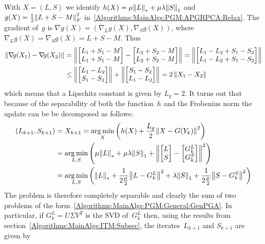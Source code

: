 \documentclass{../../common/projectreport}
\begin{document}
With $X=(L,S)$ we identify $h(X) = \mu {\left\|L\right\|}_{*}^{} + \mu \lambda {\left\|S\right\|}_{1}^{}$ and $g(X) = \frac{1}{2} {\left\|L+S-M\right\|}_{F}^{2}$ in~\eqref{Algorithms:MainAlgs:PGM:APGRPCA:Relax}. The gradient of~$g$ is $\nabla g(X) = (\nabla_{\!L} g(X),\nabla_{\!S} g(X))$, where $\nabla_{\!L} g(X) = \nabla_{\!S} g(X) = L+S-M$. Thus
\begin{align*}
{\left\|\operatorname{\nabla\!\!}g(X_1) -\operatorname{\nabla\!\!}g(X_2)\right\|}_{}^{} &= {\left\|\begin{bmatrix} L_1+S_1-M \\ L_1+S_1-M  \end{bmatrix} - \begin{bmatrix} L_2+S_2-M \\ L_2+S_2-M  \end{bmatrix}\right\|}_{}^{} = {\left\|\begin{bmatrix} L_1-L_2 + S_1-S_2 \\ L_1-L_2 + S_1-S_2  \end{bmatrix}\right\|}_{}^{} \\
&\leq {\left\|\begin{bmatrix} L_1-L_2\\ S_1-S_2  \end{bmatrix}\right\|}_{}^{} + {\left\|\begin{bmatrix} S_1-S_2\\ L_1-L_2  \end{bmatrix}\right\|}_{}^{} = 2\, {\left\|X_1-X_2\right\|}_{}^{}
\end{align*}
which means that a Lipschitz constant is given by $L_g =2$. It turns out that because of the separability of both the function~$h$ and the Frobenius norm the update can be be decomposed as follows:
%
\begin{align*}
(L_{k+1},S_{k+1}) &= X_{k+1} = \operatorname*{arg\,min}_X \left( h(X) +\frac{L_g}{2} {\left\|X-G(Y_k)\right\|}_{}^{2} \right)  \\
&= \operatorname*{arg\,min}_{L,S} \left( \mu {\left\|L\right\|}_{*}^{} + \mu \lambda {\left\|S\right\|}_{1}^{} + {\left\|\begin{bmatrix}L \\ S\end{bmatrix} - \begin{bmatrix}G_k^L \\ G_k^S\end{bmatrix} \right\|}_{}^{2} \right) \\
&= \operatorname*{arg\,min}_{L,S} \left( {\left\|L\right\|}_{*}^{} + \frac{1}{2\frac{\mu}{2}} {\left\|L - G_k^L\right\|}_{}^{2}  + \lambda {\left\|S\right\|}_{1}^{}  + \frac{1}{2\frac{\mu}{2}}  {\left\|S - G_k^S\right\|}_{}^{2} \right)
\end{align*}
The problem is therefore completely separable and clearly the sum of two problems of the form~\eqref{Algorithms:MainAlgs:PGM:General:GenPGA}. In particular, if $G_k^L = U \Sigma V^T$ is the SVD of~$G_k^L$ then, using the results from section~\ref{Algorithms:MainAlgs:ITM:Subsec}, the iterates~$L_{k+1}$ and $S_{k+1}$ are given by 
\end{document}
